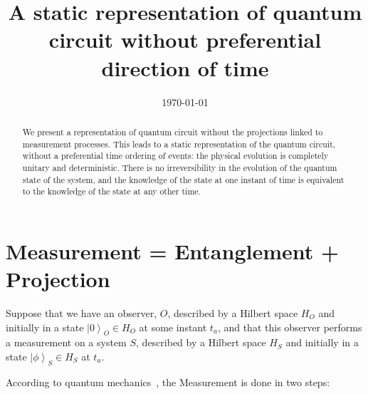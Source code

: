 \documentclass[11pt,amsmath,amssymb,latexsym,a4paper]{article}
\newcommand{\ketBasis}[2]{\left|{#1}\right>_{#2}}
\begin{document}
\title{A static representation of quantum circuit without preferential direction of time}


\date{\today}


\maketitle

\begin{abstract}
We present a representation of quantum circuit without the projections linked to measurement processes. This leads to a static representation of the quantum circuit, without a preferential time ordering of events: the physical evolution is completely unitary and deterministic. There is no irreversibility in the evolution of the quantum state of the system, and the knowledge of the state at one instant of time is equivalent to the knowledge of the state at any other time. 
\bigskip


\end{abstract}



\section{Measurement = Entanglement + Projection}  

Suppose that we have an observer, $O$, described by a Hilbert space $H_O$ and initially in a state $\ketBasis{0}{O}\in H_O$ at some instant $t_a$, and that this observer performs a measurement on a system $S$, described by a Hilbert space $H_S$ and initially in a state $\ketBasis{\phi}{S}\in H_S$ at $t_a$. 

\bigskip

According to quantum mechanics~\cite{vonNeumann}, the Measurement is done in two steps:
\end{document}
